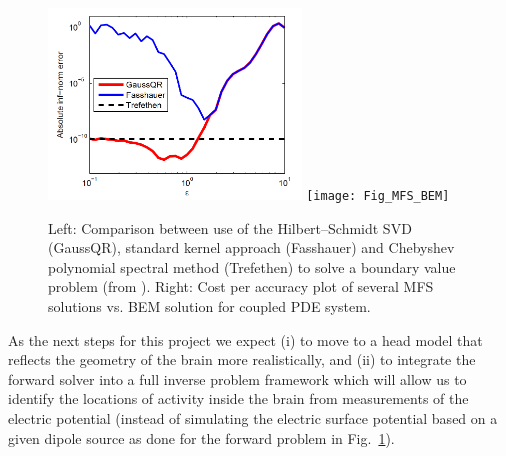 \documentclass[11pt]{NSFamsart}
\begin{document}
\begin{figure}[h]
    \centering
    \includegraphics[height=2in]{HSSVD_BVP}
    \texttt{[image: Fig\_MFS\_BEM]}
\caption{Left: Comparison between use of the Hilbert--Schmidt SVD (GaussQR), standard kernel approach (Fasshauer) and Chebyshev polynomial spectral method (Trefethen) to solve a boundary value problem (from \citep{McCourt13}). Right: Cost per accuracy plot of several MFS solutions vs. BEM solution for coupled PDE system.}\label{Fig_MFS_BEM}
\end{figure}

As the next steps for this project we expect (i) to move to a head model that reflects the geometry of the brain more realistically, and (ii) to integrate the forward solver into a full inverse problem framework which will allow us to identify the locations of activity inside the brain from measurements of the electric potential (instead of simulating the electric surface potential based on a given dipole source as done for the forward problem in Fig.~\ref{Fig_MFS_BEM}).
\end{document}
